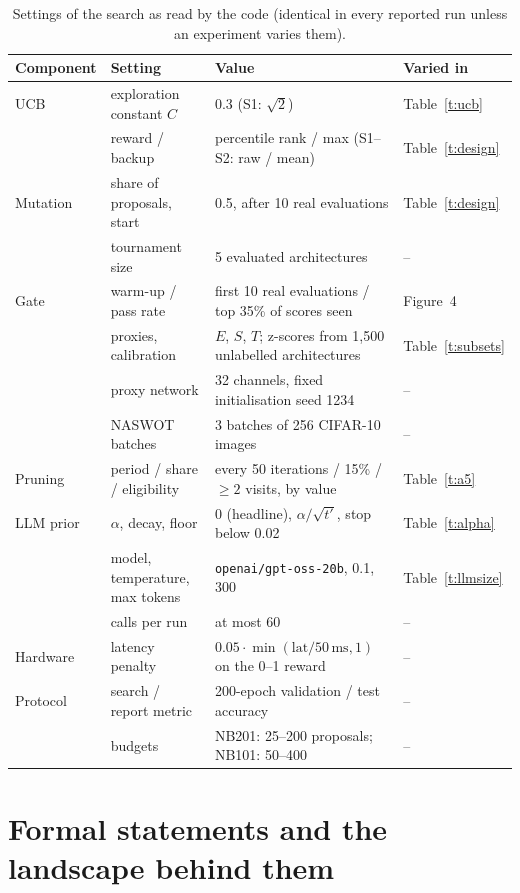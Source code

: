 \documentclass{sadhana}
\begin{document}
\begin{table}[tbp]
\caption{Settings of the search as read by the code (identical in every reported run unless an experiment varies them).}\label{t:settings}
\centering\footnotesize
\begin{tabular}{@{}llll@{}}
\toprule
Component & Setting & Value & Varied in\\
\midrule
UCB & exploration constant $C$ & 0.3 (S1: $\sqrt2$) & Table~\ref{t:ucb}\\
 & reward / backup & percentile rank / max (S1--S2: raw / mean) & Table~\ref{t:design}\\
Mutation & share of proposals, start & 0.5, after 10 real evaluations & Table~\ref{t:design}\\
 & tournament size & 5 evaluated architectures & --\\
Gate & warm-up / pass rate & first 10 real evaluations / top 35\% of scores seen & Figure~4\\
 & proxies, calibration & $E$, $S$, $T$; z-scores from 1,500 unlabelled architectures & Table~\ref{t:subsets}\\
 & proxy network & 32 channels, fixed initialisation seed 1234 & --\\
 & NASWOT batches & 3 batches of 256 CIFAR-10 images & --\\
Pruning & period / share / eligibility & every 50 iterations / 15\% / $\geq 2$ visits, by value & Table~\ref{t:a5}\\
LLM prior & $\alpha$, decay, floor & 0 (headline), $\alpha/\sqrt{t'}$, stop below 0.02 & Table~\ref{t:alpha}\\
 & model, temperature, max tokens & \texttt{openai/gpt-oss-20b}, 0.1, 300 & Table~\ref{t:llmsize}\\
 & calls per run & at most 60 & --\\
Hardware & latency penalty & $0.05\cdot\min(\mathrm{lat}/50\,\mathrm{ms},1)$ on the 0--1 reward & --\\
Protocol & search / report metric & 200-epoch validation / test accuracy & --\\
 & budgets & NB201: 25--200 proposals; NB101: 50--400 & --\\
\bottomrule
\end{tabular}
\end{table}

\section{Formal statements and the landscape behind them}\label{s:theory}
\end{document}
